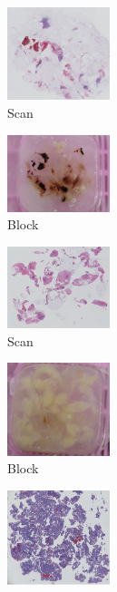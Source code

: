 \documentclass[a4paper,10pt,oneside]{article}
\begin{document}
\begin{figure}[hbtp]
	\centering
  \begin{subfigure}[b]{.2\textwidth}
    \includegraphics[width=3cm]{images/PO13-00516A1_1_7_201305171148.png}
    \caption{Scan}
  \end{subfigure}
  \begin{subfigure}[b]{.2\textwidth}
	  \includegraphics[width=3cm]{images/PO1300516_A1.JPG}
    \caption{Block}
  \end{subfigure}
  \begin{subfigure}[b]{.2\textwidth}
	  \includegraphics[width=3cm]{images/PO14-00496A1Level1_1_2_201404181459.png} 
    \caption{Scan}
  \end{subfigure}
  \begin{subfigure}[b]{.2\textwidth}
	  \includegraphics[width=3cm]{images/PO1400496_A1.JPG} 
    \caption{Block}
  \end{subfigure}
  \begin{subfigure}[b]{.2\textwidth}
	  \includegraphics[width=3cm]{images/PO14-00482B3_1_2_201404171123.png} 

\end{subfigure}
\end{figure}
\end{document}
